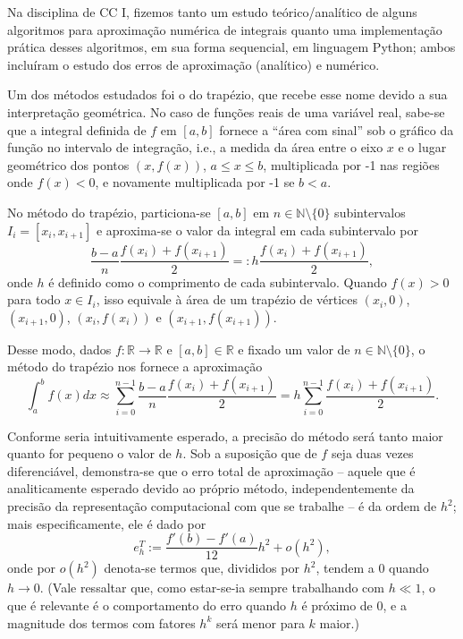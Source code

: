 \documentclass{article}
\newcommand{\R}{\mathbb{R}}
\newcommand{\N}{\mathbb{N}}
\begin{document}
  Na disciplina de CC I, fizemos tanto um estudo teórico/analítico de alguns algoritmos para aproximação numérica de integrais quanto uma implementação prática desses algoritmos, em sua forma sequencial, em linguagem Python; ambos incluíram o estudo dos erros de aproximação (analítico) e numérico. 
  
  Um dos métodos estudados foi o do trapézio, que recebe esse nome devido a sua interpretação geométrica. No caso de funções reais de uma variável real, sabe-se que a integral definida de $f$ em $[a, b]$ fornece a ``área com sinal'' sob o gráfico da função no intervalo de integração, i.e., a medida da área entre o eixo $x$ e o lugar geométrico dos pontos $(x, f(x))$, $a \leq x \leq b$, multiplicada por -1 nas regiões onde $f(x) < 0$, e novamente multiplicada por -1 se $b < a$. 
  
  No método do trapézio, particiona-se $[a, b]$ em $n \in \N \setminus \{0\}$ subintervalos $I_i = [x_i, x_{i+1}]$ e aproxima-se o valor da integral em cada subintervalo por
  \begin{equation} \label{trapterm}
    \frac{b-a}{n} \frac{f(x_i) + f(x_{i+1})}{2} =: h \frac{f(x_i) + f(x_{i+1})}{2},
  \end{equation}\noindent
  onde $h$ é definido como o comprimento de cada subintervalo. Quando $f(x) > 0$ para todo $x \in I_i$, isso equivale à área de um trapézio de vértices $(x_i, 0)$, $(x_{i+1}, 0)$, $(x_i, f(x_i))$ e $(x_{i+1}, f(x_{i+1}))$. %

  Desse modo, dados $f: \R \to \R$ e $[a, b] \in \R$ e fixado um valor de $n \in \N \setminus \{0\}$, o método do trapézio nos fornece a aproximação
  \begin{equation} \label{trapformula}
    \int_a^b f(x) dx \approx \sum_{i=0}^{n-1} \frac{b-a}{n} \frac{f(x_i) + f(x_{i+1})}{2} = h \sum_{i=0}^{n-1} \frac{f(x_i) + f(x_{i+1})}{2}.
  \end{equation}

  Conforme seria intuitivamente esperado, a precisão do método será tanto maior quanto for pequeno o valor de $h$. Sob a suposição que de $f$ seja duas vezes diferenciável, demonstra-se\cite{cci} que o erro total de aproximação -- aquele que é analiticamente esperado devido ao próprio método, independentemente da precisão da representação computacional com que se trabalhe -- é da ordem de $h^2$; mais especificamente, ele é dado por
  \begin{equation} \label{traperr}
    e^T_h := \frac{f'(b)-f'(a)}{12} h^2 + o(h^2),
  \end{equation} \noindent
  onde por $o(h^2)$ denota-se termos que, divididos por $h^2$, tendem a 0 quando $h \to 0$. (Vale ressaltar que, como estar-se-ia sempre trabalhando com $h \ll 1$, o que é relevante é o comportamento do erro quando $h$ é próximo de 0, e a magnitude dos termos com fatores $h^k$ será menor para $k$ maior.)
\end{document}
